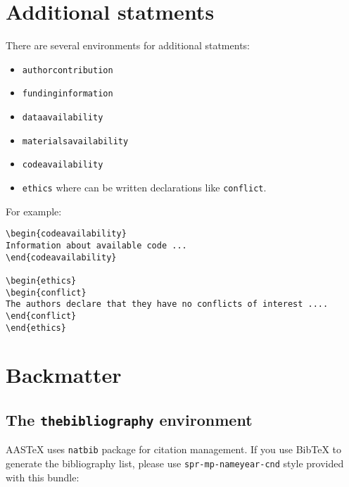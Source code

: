 \documentclass{aastex}
\begin{document}
\section{Additional statments}

There are several environments for additional statments: 
\begin{itemize}
\item \texttt{authorcontribution}
\item \texttt{fundinginformation}
\item \texttt{dataavailability}
\item \texttt{materialsavailability}
\item \texttt{codeavailability}
\item \texttt{ethics} where can be written declarations like \texttt{conflict}.
\end{itemize}

For example: 
\smallskip
\begin{footnotesize}
\begin{verbatim}
\begin{codeavailability}
Information about available code ...
\end{codeavailability}

\begin{ethics}
\begin{conflict}
The authors declare that they have no conflicts of interest ....
\end{conflict}
\end{ethics}
\end{verbatim}
\end{footnotesize}


\newpage
\section{Backmatter}


\subsection{The \texttt{thebibliography} environment}\label{ss:bib}
AASTeX uses \verb!natbib! package for citation management. 
If you use BibTeX to generate the bibliography list, please use 
\verb!spr-mp-nameyear-cnd!  style provided with this bundle: 

\smallskip
\begin{footnotesize}
\begin{verbatim}
  
                
\end{verbatim}
\end{footnotesize}
\smallskip
\end{document}
